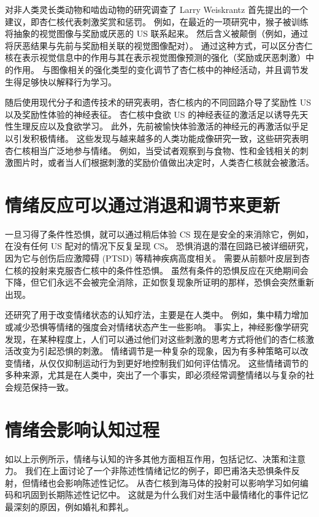 对非人类灵长类动物和啮齿动物的研究调查了 Larry Weiskrantz 首先提出的一个建议，即杏仁核代表刺激奖赏和惩罚。 例如，在最近的一项研究中，猴子被训练将抽象的视觉图像与奖励或厌恶的 US 联系起来。 然后含义被颠倒（例如，通过将厌恶结果与先前与奖励相关联的视觉图像配对）。 通过这种方式，可以区分杏仁核在表示视觉信息中的作用与其在表示视觉图像预测的强化（奖励或厌恶刺激）中的作用。 与图像相关的强化类型的变化调节了杏仁核中的神经活动，并且调节发生得足够快以解释行为学习。

随后使用现代分子和遗传技术的研究表明，杏仁核内的不同回路介导了奖励性 US 以及奖励性体验的神经表征。 杏仁核中食欲 US 的神经表征的激活足以诱导先天性生理反应以及食欲学习。 此外，先前被愉快体验激活的神经元的再激活似乎足以引发积极情绪。 这些发现与越来越多的人类功能成像研究一致，这些研究表明杏仁核相当广泛地参与情绪。 例如，当受试者观察到与食物、性和金钱相关的刺激图片时，或者当人们根据刺激的奖励价值做出决定时，人类杏仁核就会被激活。


\section{情绪反应可以通过消退和调节来更新}

一旦习得了条件性恐惧，就可以通过稍后体验 CS 现在是安全的来消除它，例如，在没有任何 US 配对的情况下反复呈现 CS。 恐惧消退的潜在回路已被详细研究，因为它与创伤后应激障碍 (PTSD) 等精神疾病高度相关。 需要从前额叶皮层到杏仁核的投射来克服杏仁核中的条件性恐惧。 虽然有条件的恐惧反应在灭绝期间会下降，但它们永远不会被完全消除，正如恢复现象所证明的那样，恐惧会突然重新出现。

还研究了用于改变情绪状态的认知疗法，主要是在人类中。 例如，集中精力增加或减少恐惧等情绪的强度会对情绪状态产生一些影响。 事实上，神经影像学研究发现，在某种程度上，人们可以通过他们对这些刺激的思考方式将他们的杏仁核激活改变为引起恐惧的刺激。 情绪调节是一种复杂的现象，因为有多种策略可以改变情绪，从仅仅抑制运动行为到更好地控制我们如何评估情况。 这些情绪调节的多种来源，尤其是在人类中，突出了一个事实，即必须经常调整情绪以与复杂的社会规范保持一致。

\section{情绪会影响认知过程}
如以上示例所示，情绪与认知的许多其他方面相互作用，包括记忆、决策和注意力。 我们在上面讨论了一个非陈述性情绪记忆的例子，即巴甫洛夫恐惧条件反射，但情绪也会影响陈述性记忆。 从杏仁核到海马体的投射可以影响学习如何编码和巩固到长期陈述性记忆中。 这就是为什么我们对生活中最情绪化的事件记忆最深刻的原因，例如婚礼和葬礼。

